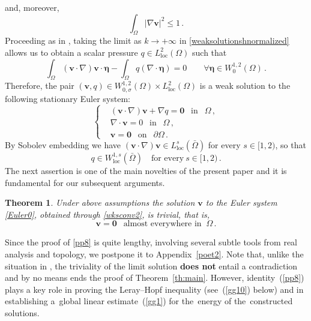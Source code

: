 \documentclass[11pt]{article}
\newtheorem{theorem}{Theorem}[section]
\numberwithin{equation}{section}
\numberwithin{figure}{section}
\def\loc{{\mathrm{loc}}}
\def\ve{{\mathbf v}}
\def\bbe{{\boldsymbol{\eta}}}
\def\0{{\mathbf 0}}
\begin{document}
and, moreover,
\begin{equation} \label{310}
	\int_{\Omega} |\nabla\ve|^2\le1 \, .
\end{equation}
Proceeding as in \cite{kpr,korobkov2015solution}, taking the limit as $k \to +\infty$ in \eqref{weaksolutionshnormalized} allows us to obtain a scalar pressure $q \in L_{\text{loc}}^{2}(\Omega)$ such that
\begin{equation} \label{weaksolutionsh4}
\int_{\Omega} (\mathbf{v} \cdot \nabla)\mathbf{v} \cdot \bbe - \int_{\Omega} q (\nabla \cdot \bbe) = 0  \qquad \forall \bbe \in W^{1,2}_{0}(\Omega) \, .
\end{equation}
Therefore, the pair $(\mathbf{v},q) \in W_{0,\sigma}^{1,2}(\Omega) \times L_{\text{loc}}^{2}(\Omega)$ is a weak solution to the following stationary Euler system:
\begin{equation}  \label{Euler0}
	\left\{
\begin{aligned}
	& (\mathbf{v} \cdot \nabla) \mathbf{v}+ \nabla q = \0 \ \ \mbox{ in } \ \ \Omega \, ,\\[4pt] &\nabla \cdot \mathbf{v} = 0 \ \ \mbox{ in } \ \ \Omega \, , \\[4pt]
	& \mathbf{v} = \0 \ \ \mbox{ on } \ \ \partial \Omega \, .
\end{aligned}
\right.
\end{equation}
By Sobolev embedding we have $(\mathbf{v} \cdot \nabla) \mathbf{v} \in L^{s}_\loc(\bar\Omega)$ for every $s \in [1, 2)$, so that
\begin{equation} \label{311}
q \in W^{1,s}_{\text{loc}}(\bar\Omega) \quad \text{for every} \ s \in [1, 2) \, .
\end{equation}
The next assertion is one of the main novelties of the present paper and it is fundamental for our subsequent arguments. 

 \begin{theorem}\label{Euler=zero} Under above assumptions the solution $\ve$ to the Euler system \eqref{Euler0}, obtained through \eqref{wksconv2}, is
\textit{trivial}, that is,
\begin{equation}  \label{pp8}
	\ve = \0 \ \ \mbox{ almost everywhere in } \ \Omega \, .
\end{equation}
\end{theorem}
Since the proof of  \eqref{pp8} is quite lengthy, involving several subtle tools from real analysis and topology, we postpone it to Appendix~\ref{poet2}.  Note that, unlike the situation in \cite{korobkov2015solution}, the triviality of the limit solution {\bf does not} entail a contradiction and by no means ends the proof of Theorem~\ref{th:main}. However, identity~(\ref{pp8}) plays a key role in proving the Leray--Hopf inequality (see~(\ref{gg10}) below) and in establishing a~global linear estimate~(\ref{gg1}) 
for the~energy of the~constructed solutions.
\end{document}
